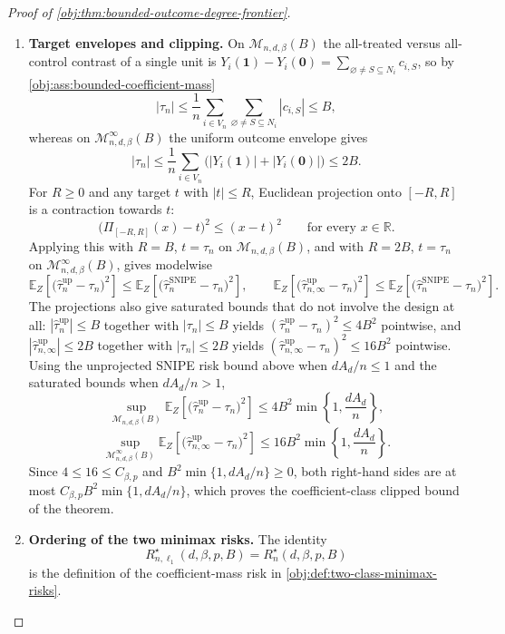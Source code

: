 \documentclass[11pt]{article}
\begin{document}
\begin{proof}[Proof of \cref{obj:thm:bounded-outcome-degree-frontier}]
\begin{enumerate}
\item \textbf{Target envelopes and clipping.}
On \(\mathcal M_{n,d,\beta}(B)\) the all-treated versus all-control contrast of a
single unit is \(Y_i(\mathbf 1)-Y_i(\mathbf 0)=\sum_{\varnothing\ne S\subseteq N_i}c_{i,S}\),
so by \cref{obj:ass:bounded-coefficient-mass}
\[
|\tau_n|
\le
\frac1n\sum_{i\in V_n}\sum_{\varnothing\ne S\subseteq N_i}|c_{i,S}|
\le B ,
\]
whereas on \(\mathcal M_{n,d,\beta}^{\infty}(B)\) the uniform outcome envelope gives
\[
|\tau_n|
\le
\frac1n\sum_{i\in V_n}\bigl(|Y_i(\mathbf 1)|+|Y_i(\mathbf 0)|\bigr)
\le 2B .
\]
For \(R\ge0\) and any target \(t\) with \(|t|\le R\), Euclidean projection onto
\([-R,R]\) is a contraction towards \(t\):
\[
\bigl(\Pi_{[-R,R]}(x)-t\bigr)^2\le (x-t)^2
\qquad\text{for every }x\in\mathbb R .
\]
Applying this with \(R=B\), \(t=\tau_n\) on \(\mathcal M_{n,d,\beta}(B)\), and with
\(R=2B\), \(t=\tau_n\) on \(\mathcal M_{n,d,\beta}^{\infty}(B)\), gives modelwise
\[
\mathbb E_Z\!\left[\bigl(\widehat\tau_n^{\mathrm{up}}-\tau_n\bigr)^2\right]
\le
\mathbb E_Z\!\left[\bigl(\widehat\tau_n^{\mathrm{SNIPE}}-\tau_n\bigr)^2\right],
\qquad
\mathbb E_Z\!\left[\bigl(\widehat\tau_{n,\infty}^{\mathrm{up}}-\tau_n\bigr)^2\right]
\le
\mathbb E_Z\!\left[\bigl(\widehat\tau_n^{\mathrm{SNIPE}}-\tau_n\bigr)^2\right].
\]
The projections also give saturated bounds that do not involve the design at
all: \(|\widehat\tau_n^{\mathrm{up}}|\le B\) together with \(|\tau_n|\le B\)
yields \((\widehat\tau_n^{\mathrm{up}}-\tau_n)^2\le 4B^2\) pointwise, and
\(|\widehat\tau_{n,\infty}^{\mathrm{up}}|\le 2B\) together with
\(|\tau_n|\le 2B\) yields
\((\widehat\tau_{n,\infty}^{\mathrm{up}}-\tau_n)^2\le 16B^2\) pointwise.  Using the unprojected SNIPE risk bound above when \(dA_d/n\le1\) and the
saturated bounds when \(dA_d/n>1\),
\[
\sup_{\mathcal M_{n,d,\beta}(B)}
\mathbb E_Z\!\left[
\bigl(\widehat\tau_n^{\mathrm{up}}-\tau_n\bigr)^2
\right]
\le
4B^2\min\!\left\{1,\frac{dA_d}{n}\right\},
\]
\[
\sup_{\mathcal M_{n,d,\beta}^{\infty}(B)}
\mathbb E_Z\!\left[
\bigl(\widehat\tau_{n,\infty}^{\mathrm{up}}-\tau_n\bigr)^2
\right]
\le
16B^2\min\!\left\{1,\frac{dA_d}{n}\right\}.
\]
Since \(4\le16\le C_{\beta,p}\) and \(B^2\min\{1,dA_d/n\}\ge0\), both right-hand
sides are at most \(C_{\beta,p}B^2\min\{1,dA_d/n\}\), which proves the
coefficient-class clipped bound of the theorem.

\item \textbf{Ordering of the two minimax risks.}
The identity
\[
R_{n,\ell_1}^{\star}(d,\beta,p,B)=R_n^{\star}(d,\beta,p,B)
\]
is the definition of the coefficient-mass risk in
\cref{obj:def:two-class-minimax-risks}.


\end{enumerate}
\end{proof}
\end{document}
